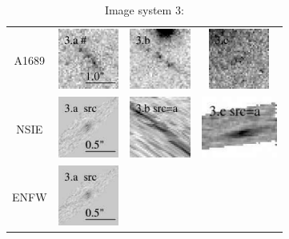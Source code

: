 \documentclass[useAMS,usenatbib]{mn2e}
\begin{document}
\begin{table}
  \caption{Image system 3:}\vspace{0mm}
  \begin{tabular}{cccc}
    \multicolumn{1}{m{1cm}}{{\Large A1689}}
    & \multicolumn{1}{m{1.7cm}}{\includegraphics[height=2.00cm,clip]{figs/nsie_img/eA1689_F850LPa.img_3_a.ps}}
    & \multicolumn{1}{m{1.7cm}}{\includegraphics[height=2.00cm,clip]{figs/nsie_img/eA1689_F850LPa.img_3_b.ps}}
    & \multicolumn{1}{m{1.7cm}}{\includegraphics[height=2.00cm,clip]{figs/nsie_img/eA1689_F850LPa.img_3_c.ps}} \\
    \multicolumn{1}{m{1cm}}{{\Large NSIE}}
    & \multicolumn{1}{m{1.7cm}}{\includegraphics[height=2.00cm,clip]{figs/nsie_img/eA1689_F850LPa.src_3_a.ps}}
    & \multicolumn{1}{m{1.7cm}}{\includegraphics[height=2.00cm,clip]{figs/nsie_img/eA1689_F850LPa.pre_3_b_a_tri.ps}}
    & \multicolumn{1}{m{1.7cm}}{\includegraphics[height=2.00cm,clip]{figs/nsie_img/eA1689_F850LPa.pre_3_c_a_tri.ps}} \\
    \multicolumn{1}{m{1cm}}{{\Large ENFW}}
    & \multicolumn{1}{m{1.7cm}}{\includegraphics[height=2.00cm,clip]{figs/enfw_img/eA1689_F850LPa.src_3_a.ps}}

\end{tabular}
\end{table}
\end{document}
